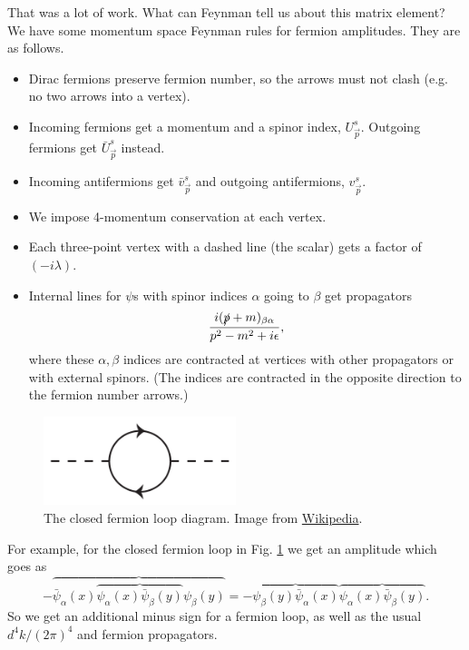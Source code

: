 That was a lot of work. What can Feynman tell us about this matrix element? We have some momentum space Feynman rules for fermion amplitudes. They are as follows. 
\begin{itemize}
    \item Dirac fermions preserve fermion number, so the arrows must not clash (e.g. no two arrows into a vertex).
    \item Incoming fermions get a momentum and a spinor index, $U_{\vec p}^s$. Outgoing fermions get $\bar U_{\vec p}^s$ instead.
    \item Incoming antifermions get $\bar v_{\vec p}^s$ and outgoing antifermions, $v_{\vec p}^s$.
    \item We impose 4-momentum conservation at each vertex.
    \item Each three-point vertex with a dashed line (the scalar) gets a factor of $(-i\lambda)$.
    \item Internal lines for $\psi$s with spinor indices $\alpha$ going to $\beta$ get propagators $$\frac{i(\slashed{p}+m)_{\beta\alpha}}{p^2-m^2+i\epsilon},$$
    where these $\alpha,\beta$ indices are contracted at vertices with other propagators or with external spinors. (The indices are contracted in the opposite direction to the fermion number arrows.)
\end{itemize}

\begin{figure}
    \centering
    \includegraphics[width=0.5\textwidth]{2018/11/20181117_oneloop.png}
    \caption{The closed fermion loop diagram. Image from \href{https://commons.wikimedia.org/wiki/File:One-loop-diagram.svg}{Wikipedia}.}
    \label{fig:oneloop}
\end{figure}
For example, for the closed fermion loop in Fig. \ref{fig:oneloop} we get an amplitude which goes as
$$-\overbrace{\bar \psi_\alpha(x) \overbrace{\psi_\alpha(x) \bar \psi_\beta(y)} \psi_\beta(y)}=-\overbrace{\psi_\beta(y) \bar \psi_\alpha(x)}\overbrace{\psi_\alpha(x)\bar \psi_\beta(y)}.$$
So we get an additional minus sign for a fermion loop, as well as the usual $d^4k/(2\pi)^4$ and fermion propagators.